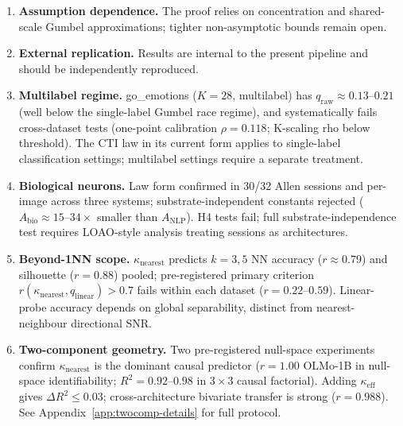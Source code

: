 \documentclass{article}
\begin{document}
\begin{enumerate}
\item \textbf{Assumption dependence.} The proof relies on concentration and shared-scale Gumbel approximations; tighter non-asymptotic bounds remain open.
\item \textbf{External replication.} Results are internal to the present pipeline and should be independently reproduced.
\item \textbf{Multilabel regime.} go\_emotions ($K=28$, multilabel) has $q_\mathrm{raw}\approx0.13$--$0.21$ (well below the single-label Gumbel race regime), and systematically fails cross-dataset tests (one-point calibration $\rho=0.118$; K-scaling rho below threshold). The CTI law in its current form applies to single-label classification settings; multilabel settings require a separate treatment.
\item \textbf{Biological neurons.} Law form confirmed in 30/32 Allen sessions and per-image across three systems; substrate-independent constants rejected ($A_\mathrm{bio}\approx15$--$34\times$ smaller than $A_\mathrm{NLP}$). H4 tests fail; full substrate-independence test requires LOAO-style analysis treating sessions as architectures.
\item \textbf{Beyond-1NN scope.} $\kappa_\mathrm{nearest}$ predicts $k=3,5$ NN accuracy ($r\approx0.79$) and silhouette ($r=0.88$) pooled; pre-registered primary criterion $r(\kappa_\mathrm{nearest}, q_\mathrm{linear})>0.7$ fails within each dataset ($r=0.22$--$0.59$). Linear-probe accuracy depends on global separability, distinct from nearest-neighbour directional SNR.
\item \textbf{Two-component geometry.} Two pre-registered null-space experiments confirm $\kappa_{\mathrm{nearest}}$ is the dominant causal predictor ($r=1.00$ OLMo-1B in null-space identifiability; $R^2=0.92$--$0.98$ in $3\times3$ causal factorial). Adding $\kappa_{\mathrm{eff}}$ gives $\Delta R^2\leq0.03$; cross-architecture bivariate transfer is strong ($r=0.988$). See Appendix~\ref{app:twocomp-details} for full protocol.
\end{enumerate}
\end{document}
